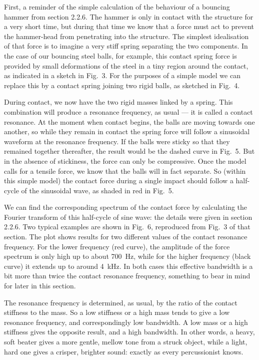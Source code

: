   First, a reminder of the simple calculation of the behaviour of a bouncing 
  hammer from section 2.2.6. The hammer is only in contact with the structure 
  for a very short time, but during that time we know that a force must act to 
  prevent the hammer-head from penetrating into the structure. The simplest 
  idealisation of that force is to imagine a very stiff spring separating the 
  two components. In the case of our bouncing steel balls, for example, this 
  contact spring force is provided by small deformations of the steel in a tiny 
  region around the contact, as indicated in a sketch in Fig.\ 3. For the 
  purposes of a simple model we can replace this by a contact spring joining 
  two rigid balls, as sketched in Fig.\ 4. 

  During contact, we now have the two rigid masses linked by a spring. This 
  combination will produce a resonance frequency, as usual — it is called a 
  contact resonance. At the moment when contact begins, the balls are moving 
  towards one another, so while they remain in contact the spring force will 
  follow a sinusoidal waveform at the resonance frequency. If the balls were 
  sticky so that they remained together thereafter, the result would be the 
  dashed curve in Fig.\ 5. But in the absence of stickiness, the force can only 
  be compressive. Once the model calls for a tensile force, we know that the 
  balls will in fact separate. So (within this simple model) the contact force 
  during a single impact should follow a half-cycle of the sinusoidal wave, as 
  shaded in red in Fig.\ 5. 

  We can find the corresponding spectrum of the contact force by calculating 
  the Fourier transform of this half-cycle of sine wave: the details were given 
  in section 2.2.6. Two typical examples are shown in Fig.\ 6, reproduced from 
  Fig.\ 3 of that section. The plot shows results for two different values of 
  the contact resonance frequency. For the lower frequency (red curve), the 
  amplitude of the force spectrum is only high up to about 700~Hz, while for 
  the higher frequency (black curve) it extends up to around 4~kHz. In both 
  cases this effective bandwidth is a bit more than twice the contact resonance 
  frequency, something to bear in mind for later in this section. 

  The resonance frequency is determined, as usual, by the ratio of the contact 
  stiffness to the mass. So a low stiffness or a high mass tends to give a low 
  resonance frequency, and correspondingly low bandwidth. A low mass or a high 
  stiffness gives the opposite result, and a high bandwidth. In other words, a 
  heavy, soft beater gives a more gentle, mellow tone from a struck object, 
  while a light, hard one gives a crisper, brighter sound: exactly as every 
  percussionist knows. 

